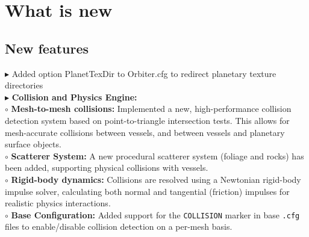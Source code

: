 \documentclass[Orbiter User Manual.tex]{subfiles}
\begin{document}
\section{What is new}

\subsection{New features}
$\blacktriangleright$ Added option PlanetTexDir to Orbiter.cfg to redirect planetary texture directories\\
$\blacktriangleright$ \textbf{Collision and Physics Engine:}\\
$\circ$ \textbf{Mesh-to-mesh collisions:} Implemented a new, high-performance collision detection system based on point-to-triangle intersection tests. This allows for mesh-accurate collisions between vessels, and between vessels and planetary surface objects.\\
$\circ$ \textbf{Scatterer System:} A new procedural scatterer system (foliage and rocks) has been added, supporting physical collisions with vessels.\\
$\circ$ \textbf{Rigid-body dynamics:} Collisions are resolved using a Newtonian rigid-body impulse solver, calculating both normal and tangential (friction) impulses for realistic physics interactions.\\
$\circ$ \textbf{Base Configuration:} Added support for the \texttt{COLLISION} marker in base \texttt{.cfg} files to enable/disable collision detection on a per-mesh basis.\\
\end{document}
